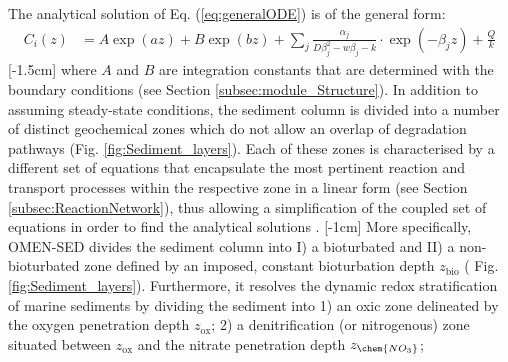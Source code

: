 \documentclass[gmd, manuscript]{copernicus}
\begin{document}
The analytical solution of Eq. (\ref{eq:generalODE}) is of the general form:
\begin{align}
 C_i(z) &= A \exp(az) + B  \exp(bz) + \sum_j \frac{\alpha_j}{D \beta_j^2-w\beta_j-k}\cdot \exp(-\beta_j z) + \frac{Q}{k} \label{eq:ODE_general_solution_generalapproach}
\end{align}
[-1.5cm]%
where $A$ and $B$ are integration constants that are determined with the boundary conditions (see Section \ref{subsec:module_Structure}). 
In addition to assuming steady-state conditions, the sediment column is divided into a number of distinct geochemical zones which do not allow an overlap of degradation pathways (Fig. \ref{fig:Sediment_layers}). 
Each of these zones is characterised by a different set of equations that encapsulate the most pertinent reaction and transport processes within the respective zone in a linear form (see Section \ref{subsec:ReactionNetwork}), 
thus allowing a simplification of the coupled set of equations in order to find the analytical solutions \citep[compare e.g. ][for similar solutions]{billen1982idealized, goloway_diagenetic_1982, tromp_global_1995, gypens_simple_2008}. 
[-1cm]%
More specifically, OMEN-SED divides the sediment column into I) a bioturbated and 
II) a non-bioturbated zone defined by an imposed, constant bioturbation depth $z_{\mathrm{bio}}$ ( Fig. \ref{fig:Sediment_layers}). Furthermore, it resolves the dynamic redox stratification of marine sediments by dividing 
the sediment into 1) an oxic zone delineated by the oxygen penetration depth $z_{\mathrm{ox}}$; 2) a denitrification (or nitrogenous) zone situated between $z_{\mathrm{ox}}$ and the nitrate penetration depth $z_{\chem{NO_3}}$;
\end{document}
